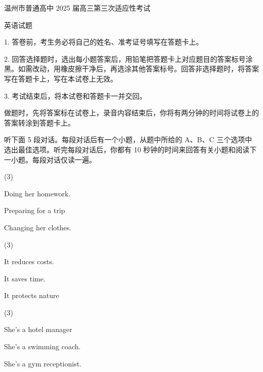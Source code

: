 \documentclass{英语试卷}
\begin{document}
\par 温州市普通高中 2025 届高三第三次适应性考试\par
\par 英语试题\par
\begin{notice}
\par 1. 答卷前，考生务必将自己的姓名、准考证号填写在答题卡上。\par
\par 2. 回答选择题时，选出每小题答案后，用铅笔把答题卡上对应题目的答案标号涂黑。如需改动，用橡皮擦干净后，再选涂其他答案标号。回答非选择题时，将答案写在答题卡上，写在本试卷上无效。\par
\par 3. 考试结束后，将本试卷和答题卡一并交回。\par
\end{notice}
\par 做题时，先将答案标在试卷上，录音内容结束后，你将有两分钟的时间将试卷上的答案转涂到答题卡上。\par
{}
\par 听下面 5 段对话。每段对话后有一个小题，从题中所给的 A、B、C 三个选项中选出最佳选项。听完每段对话后，你都有 10 秒钟的时间来回答有关小题和阅读下一小题。每段对话仅读一遍。\par
{}
\begin{choices}(3)
  \item Doing her homework.
  \item Preparing for a trip
  \item Changing her clothes.
\end{choices}
\begin{choices}(3)
  \item It reduces costs.
  \item It saves time.
  \item It protects nature
\end{choices}
\begin{choices}(3)
  \item She's a hotel manager
  \item She's a swimming coach.
  \item She's a gym receptionist.
\end{choices}
\end{document}
